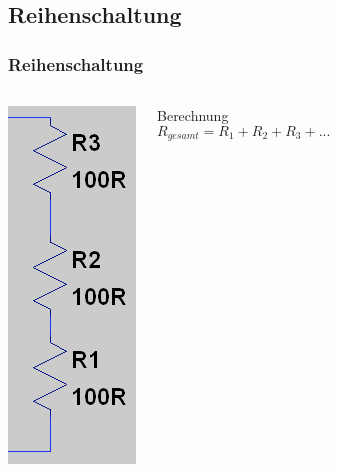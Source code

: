 \subsection{Reihenschaltung}
\begin{frame}
  \frametitle{Reihenschaltung}

  \begin{columns}
    \begin{center}
      \includegraphics[width=.4\textwidth]{e04/Reihe.png}\footnotemark
    \end{center}
    \pause
    \begin{block}{Berechnung}
      $$R_{gesamt} = R_1 + R_2 + R_3 + ...$$
    \end{block}
  \end{columns}

\end{frame}

